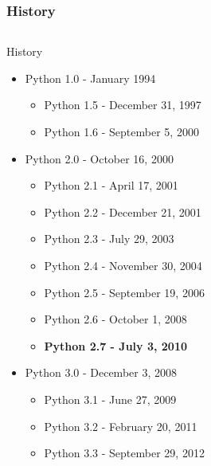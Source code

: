\documentclass[colorlinks]{beamer}
\begin{document}
\begin{frame}[fragile]\frametitle{History}
\begin{columns}[T]
    \begin{column}{.7\textwidth}
        \begin{block}{\centering History}
\small
            \begin{itemize}
                 \item Python 1.0 - January 1994
                    \begin{itemize}
\tiny
                        \item Python 1.5 - December 31, 1997
                        \item Python 1.6 - September 5, 2000
                    \end{itemize}
                \item Python 2.0 - October 16, 2000
                    \begin{itemize}
\tiny
                        \item Python 2.1 - April 17, 2001
                        \item Python 2.2 - December 21, 2001
                        \item Python 2.3 - July 29, 2003
                        \item Python 2.4 - November 30, 2004
                        \item Python 2.5 - September 19, 2006
                        \item Python 2.6 - October 1, 2008
                        \item \textbf{Python 2.7 - July 3, 2010}
                    \end{itemize}
                \item Python 3.0 - December 3, 2008
                    \begin{itemize}
\tiny
                        \item Python 3.1 - June 27, 2009
                        \item Python 3.2 - February 20, 2011
                        \item Python 3.3 - September 29, 2012
                    \end{itemize}
            \end{itemize}
        \end{block}
    \end{column}
    \begin{column}{.3\textwidth}

\end{column}
\end{columns}
\end{frame}
\end{document}

